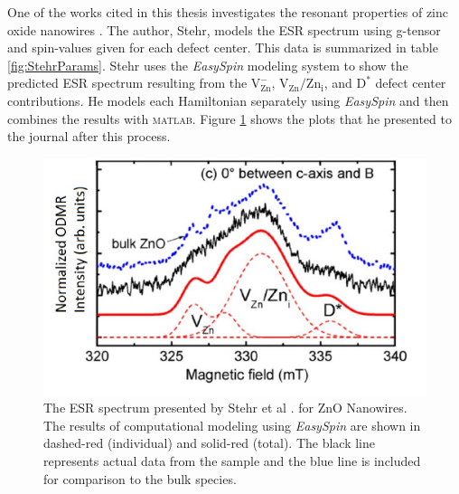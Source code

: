\documentclass[oneside, astronomy, noacknowlegments]{BYUPhys}
\begin{document}
One of the works cited in this thesis investigates the resonant properties of zinc oxide nanowires \cite{RefWorks:doc:58929128e4b0228a292928a7}. The author, Stehr, models the ESR spectrum using g-tensor and spin-values given for each defect center. This data is summarized in table \ref{fig:StehrParams}. Stehr uses the \textit{EasySpin} modeling system to show the predicted ESR spectrum resulting from the $\text{V}_{\text{Zn}}^{-}$, $\text{V}_{\text{Zn}}/\text{Zn}_{\text{i}}$, and $\text{D}^{*}$ defect center contributions. He models each Hamiltonian separately using \textit{EasySpin} and then combines the results with \textsc{matlab}. Figure \ref{fig:StehrPlots} shows the plots that he presented to the journal after this process.

\begin{figure}
    \centerline{\includegraphics{stehr_fig}}
    \caption[ESR Spectrum Presented by Stehr et al.]{\label{fig:StehrPlots}
     The ESR spectrum presented by Stehr et al \cite{RefWorks:doc:58929128e4b0228a292928a7}. for ZnO Nanowires. The results of computational modeling using \textit{EasySpin} are shown in dashed-red (individual) and solid-red (total). The black line represents actual data from the sample and the blue line is included for comparison to the bulk species.}
 \end{figure}
\end{document}
